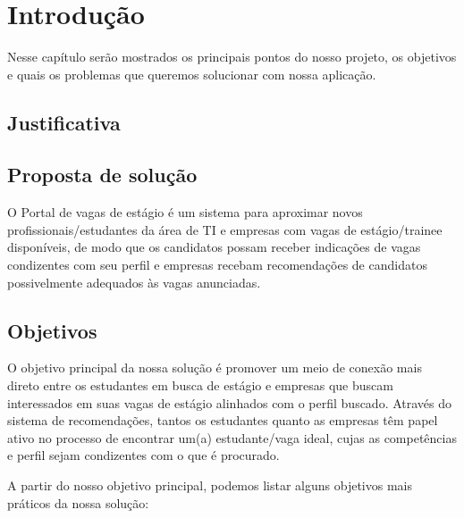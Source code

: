 
\chapter[Introdução]{Introdução}

Nesse capítulo serão mostrados os principais pontos do nosso projeto, os objetivos e quais os problemas que queremos solucionar com nossa aplicação.

\section{Justificativa}

\section{Proposta de solução}
O Portal de vagas de estágio é um sistema para aproximar novos profissionais/estudantes da área de TI e empresas com vagas de estágio/trainee disponíveis, de modo que os candidatos possam receber indicações de vagas condizentes com seu perfil e empresas recebam recomendações de candidatos possivelmente adequados às vagas anunciadas.

\section{Objetivos}
O objetivo principal da nossa solução é promover um meio de conexão mais direto entre os estudantes em busca de estágio e empresas que buscam interessados em suas vagas de estágio alinhados com o perfil buscado. Através do sistema de recomendações, tantos os estudantes quanto as empresas têm papel ativo no processo de encontrar um(a) estudante/vaga ideal, cujas as competências e perfil sejam condizentes com o que é procurado.

A partir do nosso objetivo principal, podemos listar alguns objetivos mais práticos da nossa solução:

